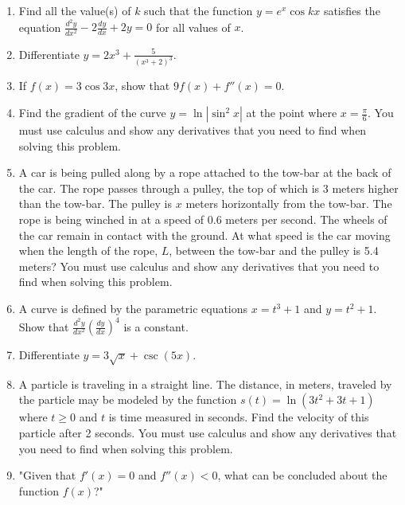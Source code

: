 \documentclass{article}
\begin{document}
\begin{enumerate}
\vspace{3cm}
\item Find all the value(s) of \( k \) such that the function \( y = e^x \cos kx \) satisfies the equation \(\frac{d^2y}{dx^2} - 2 \frac{dy}{dx} + 2y = 0\) for all values of \( x \).
\vspace{3cm}
\item Differentiate \( y = 2x^3 + \frac{5}{(x^3 + 2)^3} \).
\vspace{3cm}
\item If \( f(x) = 3 \cos 3x \), show that \( 9f(x) + f''(x) = 0 \).
\vspace{3cm}
\item Find the gradient of the curve \( y = \ln |\sin^2 x| \) at the point where \( x = \frac{\pi}{6} \). You must use calculus and show any derivatives that you need to find when solving this problem.
\vspace{3cm}
\item A car is being pulled along by a rope attached to the tow-bar at the back of the car. The rope passes through a pulley, the top of which is 3 meters higher than the tow-bar. The pulley is \( x \) meters horizontally from the tow-bar. The rope is being winched in at a speed of 0.6 meters per second. The wheels of the car remain in contact with the ground. At what speed is the car moving when the length of the rope, \( L \), between the tow-bar and the pulley is 5.4 meters? You must use calculus and show any derivatives that you need to find when solving this problem.
\vspace{3cm}
\item A curve is defined by the parametric equations \( x = t^3 + 1 \) and \( y = t^2 + 1 \). Show that \(\frac{d^2y}{dx^2} \left( \frac{dy}{dx} \right)^4\) is a constant.
\vspace{3cm}
\item Differentiate \( y = 3\sqrt{x} + \csc(5x) \).
\vspace{3cm}
\item A particle is traveling in a straight line. The distance, in meters, traveled by the particle may be modeled by the function \( s(t) = \ln(3t^2 + 3t + 1) \) where \( t \geq 0 \) and \( t \) is time measured in seconds. Find the velocity of this particle after 2 seconds. You must use calculus and show any derivatives that you need to find when solving this problem.
\vspace{3cm}
\item "Given that \( f'(x) = 0 \) and \( f''(x) < 0 \), what can be concluded about the function \( f(x) \)?"

\end{enumerate}
\end{document}
